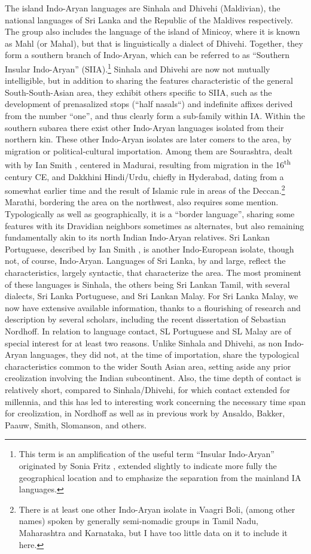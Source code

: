 The island Indo-Aryan languages are Sinhala and Dhivehi (Maldivian), the national languages of Sri Lanka and the Republic of the Maldives respectively. The group also includes the language of the island of Minicoy, where it is known as Mahl (or Mahal), but that is linguistically a dialect of Dhivehi. Together, they form a southern branch of Indo-Aryan, which can be referred to as ``Southern Insular Indo-Aryan'' (SIIA).\footnote{This
  term is an amplification of the useful term ``Insular Indo-Aryan'' originated by Sonia Fritz \citep{Fritz2002}, extended slightly to indicate more fully the geographical location and to emphasize the separation from the mainland IA languages.
}
Sinhala and Dhivehi are now not mutually intelligible, but in addition to sharing the features characteristic of the general South-South-Asian area, they exhibit others specific to SIIA, such as the development of prenasalized stops (``half nasals``) and indefinite affixes derived from the number ``one'', and thus clearly form a sub-family within IA. 
Within the southern subarea there exist other Indo-Aryan languages isolated from their northern kin. These other Indo-Aryan isolates are later comers to the area, by migration or political-cultural importation. Among them are Sourashtra, dealt with by Ian Smith \citep{Smithtv}, centered in Madurai, resulting from migration in the 16\textsuperscript{th} century CE, and Dakkhini Hindi/Urdu, chiefly in Hyderabad, dating from a somewhat earlier time and the result of Islamic rule in areas of the Deccan.\footnote{There
  is at least one other Indo-Aryan isolate in Vaagri Boli, (among other names) spoken by generally semi-nomadic groups in Tamil Nadu, Maharashtra and Karnataka, but I have too little data on it to include it here.
} 
Marathi, bordering the area on the northwest, also requires some mention. Typologically as well as geographically, it is a ``border language'', sharing some features with its Dravidian neighbors sometimes as alternates, but also remaining fundamentally akin to its north Indian Indo-Aryan relatives. Sri Lankan Portuguese, described by Ian Smith \citep{Smithtv}, is another Indo-European isolate, though not, of course, Indo-Aryan. 
Languages of Sri Lanka, by and large, reflect the characteristics, largely syntactic, that characterize the area. The most prominent of these languages is Sinhala, the others being Sri Lankan Tamil, with several dialects, Sri Lanka Portuguese, and Sri Lankan Malay. For Sri Lanka Malay, we now have extensive available information, thanks to a flourishing of research and description by several scholars, including the recent dissertation of Sebastian Nordhoff. In relation to language contact, SL Portuguese and SL Malay are of special interest for at least two reasons. Unlike Sinhala and Dhivehi, as non Indo-Aryan languages, they did not, at the time of importation, share the typological characteristics common to the wider South Asian area, setting aside any prior creolization involving the Indian subcontinent. Also, the time depth of contact is relatively short, compared to Sinhala/Dhivehi, for which contact extended for millennia, and this has led to interesting work concerning the necessary time span for creolization, in Nordhoff as well as in previous work by Ansaldo, Bakker, Paauw, Smith, Slomanson, and others. 
